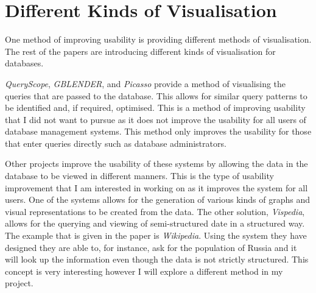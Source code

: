 \section{Different Kinds of Visualisation}

One method of improving usability is providing different methods of
visualisation. The rest of the
papers\cite{Hu2008,Haritsa2010,Yang2010,Jin2010,Chan2009} are introducing
different kinds of visualisation for databases.

\emph{QueryScope}\cite{Hu2008}, \emph{GBLENDER}\cite{Jin2010}, and
\emph{Picasso}\cite{Haritsa2010} provide a method of visualising the queries
that are passed to the database. This allows for similar query patterns to be
identified and, if required, optimised. This is a method of improving usability
that I did not want to pursue as it does not improve the usability for all
users of database management systems. This method only improves the usability
for those that enter queries directly such as database administrators.

Other projects\cite{Yang2010,Chan2009} improve the usability of these systems
by allowing the data in the database to be viewed in different manners. This is
the type of usability improvement that I am interested in working on as it
improves the system for all users. One of the systems\cite{Yang2010} allows for
the generation of various kinds of graphs and visual representations to be
created from the data. The other solution, \emph{Vispedia}\cite{Chan2009},
allows for the querying and viewing of semi-structured date in a structured
way. The example that is given in the paper is \emph{Wikipedia}. Using the
system they have designed they are able to, for instance, ask for the
population of Russia and it will look up the information even though the data
is not strictly structured. This concept is very interesting however I will
explore a different method in my project.
